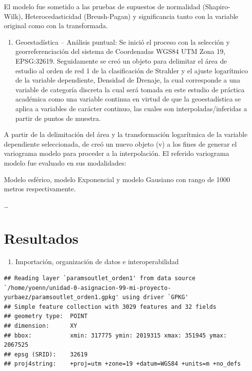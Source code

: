 \documentclass[11pt,]{article}
\providecommand{\tightlist}{%
\setlength{\itemsep}{0pt}\setlength{\parskip}{0pt}}
\begin{document}
El modelo fue sometido a las pruebas de supuestos de normalidad
(Shapiro-Wilk), Heterocedasticidad (Breush-Pagan) y significancia tanto
con la variable original como con la transformada.

\begin{enumerate}
\def\labelenumi{\arabic{enumi}.}
\setcounter{enumi}{2}
\tightlist
\item
  Geoestadística -- Análisis puntual: Se inició el proceso con la
  selección y georreferenciación del sistema de Coordenadas WGS84 UTM
  Zona 19, EPSG:32619. Seguidamente se creó un objeto para delimitar el
  área de estudio al orden de red 1 de la clasificación de Strahler y el
  ajuste logarítmico de la variable dependiente, Densidad de Drenaje, la
  cual corresponde a una variable de categoría discreta la cual será
  tomada en este estudio de práctica académica como una variable
  continua en virtud de que la geoestadística se aplica a variables de
  carácter continuo, las cuales son interpoladas/inferidas a partir de
  puntos de muestra.
\end{enumerate}

A partir de la delimitación del área y la transformación logarítmica de
la variable dependiente seleccionada, de creó un nuevo objeto (v) a los
fines de generar el variograma modelo para proceder a la interpolación.
El referido variograma modelo fue evaluado en sus modalidades:

Modelo esférico, modelo Exponencial y modelo Gausiano con rango de 1000
metros respectivamente.

\ldots

\section{Resultados}\label{resultados}

\begin{enumerate}
\def\labelenumi{\Roman{enumi}.}
\tightlist
\item
  Importación, organización de datos e interoperabilidad
\end{enumerate}

\begin{verbatim}
## Reading layer `paramsoutlet_orden1' from data source `/home/yoenn/unidad-0-asignacion-99-mi-proyecto-yurbaez/paramsoutlet_orden1.gpkg' using driver `GPKG'
## Simple feature collection with 3029 features and 32 fields
## geometry type:  POINT
## dimension:      XY
## bbox:           xmin: 317775 ymin: 2019315 xmax: 351945 ymax: 2067525
## epsg (SRID):    32619
## proj4string:    +proj=utm +zone=19 +datum=WGS84 +units=m +no_defs
\end{verbatim}
\end{document}
